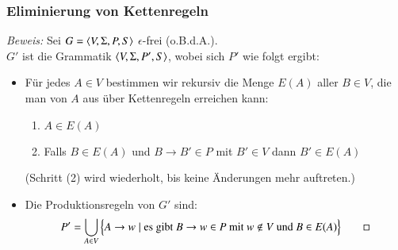 \documentclass[aspectratio=1610,onlymath]{beamer}
\begin{document}
\begin{frame}\frametitle{Eliminierung von Kettenregeln}

\bigskip
\pause

\pause

\emph{Beweis:} Sei $G=\langle{V,\Sigma,P,S}\rangle$ $\epsilon$-frei (o.B.d.A.).\\$G'$ ist die Grammatik $\langle{V,\Sigma,P',S}\rangle$, wobei sich $P'$ wie folgt ergibt: %

\begin{itemize}
\item Für jedes $A\in V$ bestimmen wir rekursiv die Menge $E(A)$ aller $B\in V$, die man von $A$ aus über Kettenregeln erreichen kann:
\begin{enumerate}[(1)]
\item $A\in E(A)$
\item Falls $B\in E(A)$ und $B\to B'\in P$ mit $B'\in V$ dann $B'\in E(A)$
\end{enumerate}
{\footnotesize(Schritt (2) wird wiederholt, bis keine Änderungen mehr auftreten.)}
\item Die Produktionsregeln von $G'$ sind:
 \[P' = \bigcup_{A\in V}\Big\{ A\to w\mid \text{es gibt }B\to w\in P\text{ mit }w\notin V\text{ und }B\in E(A)\Big\}\qed\]
\end{itemize}


\end{frame}
\end{document}
